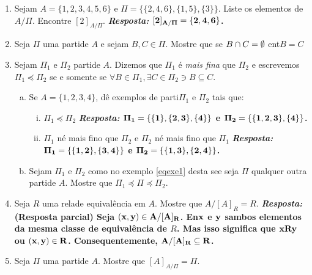 \begin{enumerate}[{\bf 1.}]

\item Sejam $A=\{1,2,3,4,5,6\}$ e $\Pi=\{\{2,4,6\},\{1,5\},\{3\}\}$. Liste os elementos de $A/\Pi$. Encontre $[2]_{A/\Pi}$. 
{\bf{\it Resposta:} ${\bf [2]_{A/\Pi}=\{2,4,6\}}$.}

\item Seja $\Pi$ uma parti\cao de $A$ e sejam $B,C\in\Pi$. Mostre que se $B\cap C=\emptyset$ ent\ao $B=C$

\item\label{eqrexcerc3} Sejam $\Pi_1$ e $\Pi_2$ parti\coes de $A$. Dizemos que $\Pi_1$ \'e {\it mais fina} que $\Pi_2$ e escrevemos $\Pi_1\preceq\Pi_2$ se e somente se $\forall B\in \Pi_1, \exists C\in \Pi_2 \ni B\subseteq C$.
\begin{enumerate}[a)]
\item Se $A=\{1,2,3,4\}$, d\^e exemplos de parti\coes $\Pi_1$ e $\Pi_2$ tais que:
\begin{enumerate}[i.]
\item $\Pi_1\preceq\Pi_2$ {\bf{\it Resposta:} ${\bf \Pi_1=\{\{1\},\{2,3\},\{4\}\}}$ e ${\bf \Pi_2=\{\{1,2,3\},\{4\}\}}$.}
\item $\Pi_1$ n\ao \'e mais fino que $\Pi_2$ e $\Pi_2$ n\ao \'e mais fino que $\Pi_1$ {\bf{\it Resposta:} ${\bf \Pi_1=\{\{1,2\},\{3,4\}\}}$ e ${\bf \Pi_2=\{\{1,3\},\{2,4\}\}}$.}
\end{enumerate}
\item Sejam $\Pi_1$ e $\Pi_2$ como no exemplo \ref{eqexe1} desta se\cao e seja $\Pi$ qualquer outra parti\cao de $A$. Mostre que $\Pi_1\preceq\Pi\preceq\Pi_2$.
\end{enumerate}

\item Seja $R$ uma rela\cao de equival\^encia em $A$. Mostre que $A/[A]_R=R$. {\bf{\it Resposta:} (Resposta parcial) Seja ${\bf (x,y)\in A/[A]_R }$. En\tao ${\bf x}$ e ${\bf y}$ s\ao ambos elementos da mesma classe de equival\^encia de $R$. Mas isso significa que ${\bf xRy}$ ou ${\bf (x,y)\in R}$. Consequentemente, ${\bf A/[A]_R\subseteq R}$.}

\item Seja $\Pi$ uma parti\cao de $A$. Mostre que $[A]_{A/\Pi}=\Pi$.


\end{enumerate}
